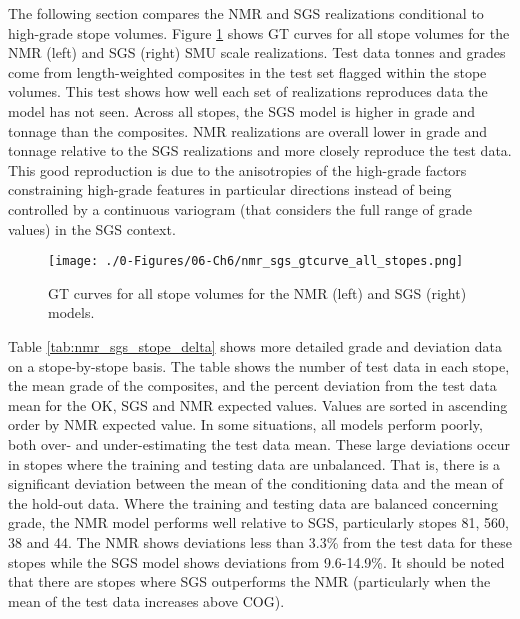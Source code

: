 The following section compares the \gls{NMR} and \gls{SGS} realizations conditional to high-grade stope volumes. Figure \ref{fig:nmr_sgs_gtcurve_all_stopes} shows \gls{GT} curves for all stope volumes for the \gls{NMR} (left) and \gls{SGS} (right) \gls{SMU} scale realizations. Test data tonnes and grades come from length-weighted composites in the test set flagged within the stope volumes. This test shows how well each set of realizations reproduces data the model has not seen. Across all stopes, the \gls{SGS} model is higher in grade and tonnage than the composites. \gls{NMR} realizations are overall lower in grade and tonnage relative to the \gls{SGS} realizations and more closely reproduce the test data. This good reproduction is due to the anisotropies of the high-grade factors constraining high-grade features in particular directions instead of being controlled by a continuous variogram (that considers the full range of grade values) in the \gls{SGS} context.

\begin{figure}[htb!]
    \centering
    \texttt{[image: ./0-Figures/06-Ch6/nmr\_sgs\_gtcurve\_all\_stopes.png]}
    \caption{\Gls{GT} curves for all stope volumes for the \gls{NMR} (left) and \gls{SGS} (right) models. }
    \label{fig:nmr_sgs_gtcurve_all_stopes}
\end{figure}

Table \ref{tab:nmr_sgs_stope_delta} shows more detailed grade and deviation data on a stope-by-stope basis. The table shows the number of test data in each stope, the mean grade of the composites, and the percent deviation from the test data mean for the \gls{OK}, \gls{SGS} and \gls{NMR} expected values. Values are sorted in
ascending order by \gls{NMR} expected value. In some situations, all models perform poorly, both over- and under-estimating the test data mean. These large deviations occur in stopes where the training and testing data are unbalanced. That is, there is a significant deviation between the mean of the conditioning data and the mean of the hold-out data. Where the training and testing data are balanced concerning grade, the \gls{NMR} model performs well relative to \gls{SGS}, particularly stopes 81, 560, 38 and 44. The \gls{NMR} shows deviations less than 3.3\% from the test data for these stopes while the \gls{SGS} model shows deviations from 9.6-14.9\%. It should be noted that there are stopes where \gls{SGS} outperforms the \gls{NMR} (particularly when the mean of the test data increases above \gls{COG}).

